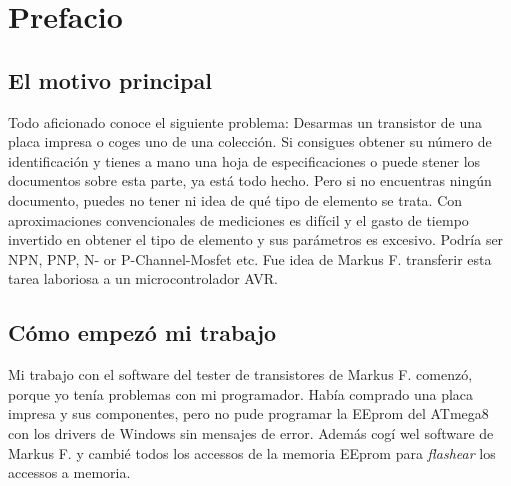 \section*{Prefacio}
\subsection*{El motivo principal}
Todo aficionado conoce el siguiente problema: Desarmas un transistor de una placa impresa o coges uno de una colección.
Si consigues obtener su número de identificación y tienes a mano una hoja de especificaciones o puede stener los documentos sobre esta parte, ya está todo hecho.
Pero si no encuentras ningún documento, puedes no tener ni idea de qué tipo de elemento se trata.
Con aproximaciones convencionales de mediciones es difícil y el gasto de tiempo invertido en obtener el tipo de elemento y sus parámetros es excesivo.
Podría ser NPN, PNP, N- or P-Channel-Mosfet etc.
Fue idea de Markus F. transferir esta tarea laboriosa a un microcontrolador AVR.

\subsection*{Cómo empezó mi trabajo}
Mi trabajo con el software del tester de transistores de Markus F. \cite{Frejek} comenzó, porque yo tenía problemas con mi programador. 
Había comprado una placa impresa y sus componentes, pero no pude programar la EEprom del ATmega8 con los drivers de Windows sin mensajes de error.
Además cogí wel software de Markus F. y cambié todos los accessos de la memoria EEprom para \textit{flashear} los accessos a memoria.

